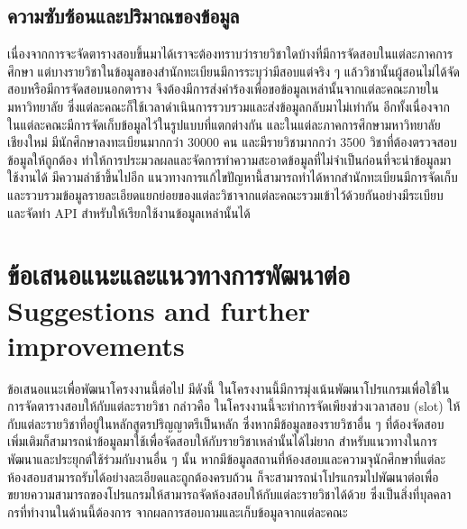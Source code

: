 \subsection{ความซับซ้อนและปริมาณของข้อมูล}
เนื่องจากการจะจัดตารางสอบขึ้นมาได้เราจะต้องทราบว่ารายวิชาใดบ้างที่มีการจัดสอบในแต่ละภาคการศึกษา 
แต่บางรายวิชาในข้อมูลของสำนักทะเบียนมีการระบุว่ามีสอบแต่จริง ๆ แล้ววิชานั้นผู้สอนไม่ได้จัดสอบหรือมีการจัดสอบนอกตาราง
จึงต้องมีการส่งคำร้องเพื่อขอข้อมูลเหล่านั้นจากแต่ละคณะภายในมหาวิทยาลัย ซึ่งแต่ละคณะก็ใช้เวลาดำเนินการรวบรวมและส่งข้อมูลกลับมาไม่เท่ากัน
อีกทั้งเนื่องจากในแต่ละคณะมีการจัดเก็บข้อมูลไว้ในรูปแบบที่แตกต่างกัน และในแต่ละภาคการศึกษามหาวิทยาลัยเชียงใหม่ 
มีนักศึกษาลงทะเบียนมากกว่า 30000 คน และมีรายวิชามากกว่า 3500 วิชาที่ต้องตรวจสอบข้อมูลให้ถูกต้อง
ทำให้การประมวลผลและจัดการทำความสะอาดข้อมูลที่ไม่จำเป็นก่อนที่จะนำข้อมูลมาใช้งานได้ มีความล่าช้าขึ้นไปอีก 
แนวทางการแก้ไขปัญหานี้สามารถทำได้หากสำนักทะเบียนมีการจัดเก็บและรวบรวมข้อมูลรายละเอียดแยกย่อยของแต่ละวิชาจากแต่ละคณะรวมเข้าไว้ด้วยกันอย่างมีระเบียบ
และจัดทำ API สำหรับให้เรียกใช้งานข้อมูลเหล่านั้นได้


\section{\ifcpe%
ข้อเสนอแนะและแนวทางการพัฒนาต่อ
\else%
Suggestions and further improvements
\fi
}

ข้อเสนอแนะเพื่อพัฒนาโครงงานนี้ต่อไป มีดังนี้
ในโครงงานนี้มีการมุ่งเน้นพัฒนาโปรแกรมเพื่อใช้ในการจัดตารางสอบให้กับแต่ละรายวิชา กล่าวคือ ในโครงงานนี้จะทำการจัดเพียงช่วงเวลาสอบ (slot)
ให้กับแต่ละรายวิชาที่อยู่ในหลักสูตรปริญญาตรีเป็นหลัก ซึ่งหากมีข้อมูลของรายวิชาอื่น ๆ ที่ต้องจัดสอบเพิ่มเติมก็สามารถนำข้อมูลมาใช้เพื่อจัดสอบให้กับรายวิชาเหล่านั้นได้ไม่ยาก
สำหรับแนวทางในการพัฒนาและประยุกต์ใช้ร่วมกับงานอื่น ๆ นั้น หากมีข้อมูลสถานที่ห้องสอบและความจุนักศึกษาที่แต่ละห้องสอบสามารถรับได้อย่างละเอียดและถูกต้องครบถ้วน
ก็จะสามารถนำโปรแกรมไปพัฒนาต่อเพื่อขยายความสามารถของโปรแกรมให้สามารถจัดห้องสอบให้กับแต่ละรายวิชาได้ด้วย ซึ่งเป็นสิ่งที่บุลคลากรที่ทำงานในด้านนี้ต้องการ จากผลการสอบถามและเก็บข้อมูลจากแต่ละคณะ